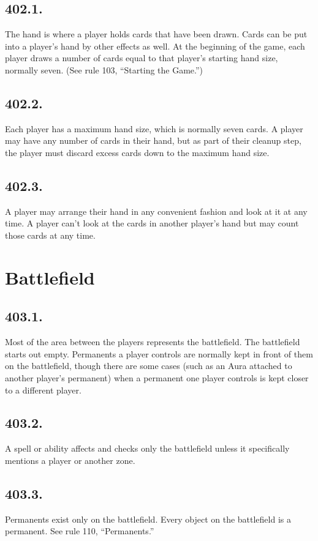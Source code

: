 \subsection*{402.1.}
The hand is where a player holds cards that have been drawn. Cards can be put into a player’s hand by other effects as well. At the beginning of the game, each player draws a number of cards equal to that player’s starting hand size, normally seven. (See rule 103, “Starting the Game.”)

\subsection*{402.2.}
Each player has a maximum hand size, which is normally seven cards. A player may have any number of cards in their hand, but as part of their cleanup step, the player must discard excess cards down to the maximum hand size.

\subsection*{402.3.}
A player may arrange their hand in any convenient fashion and look at it at any time. A player can’t look at the cards in another player’s hand but may count those cards at any time.

\section{Battlefield}
\subsection*{403.1.}
Most of the area between the players represents the battlefield. The battlefield starts out empty. Permanents a player controls are normally kept in front of them on the battlefield, though there are some cases (such as an Aura attached to another player’s permanent) when a permanent one player controls is kept closer to a different player.

\subsection*{403.2.}
A spell or ability affects and checks only the battlefield unless it specifically mentions a player or another zone.

\subsection*{403.3.}
Permanents exist only on the battlefield. Every object on the battlefield is a permanent. See rule 110, “Permanents.”

